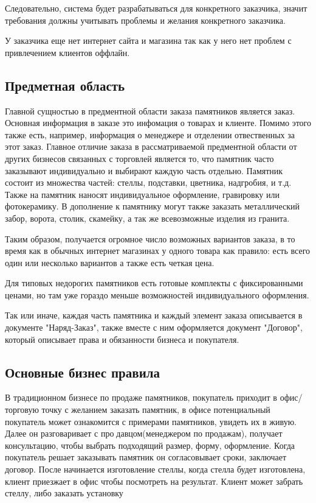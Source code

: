 \documentclass[a4paper,article,14pt]{extarticle}
\begin{document}
Следовательно, система будет разрабатываться для конкретного заказчика, значит требования должны учитывать проблемы и желания
конкретного заказчика.

У заказчика еще нет интернет сайта и магазина так как у него нет проблем с привлечением клиентов оффлайн.

\subsection{Предметная область}
Главной сущностью в предментной области заказа памятников является заказ.
Основная информация в заказе это инфомация о товарах и клиенте.
Помимо этого также есть, например, информация о менеджере и отделении отвественных за этот заказ.
Главное отличие заказа в рассматриваемой предментной области от других бизнесов связанных с торговлей является то, что
памятник часто заказывают индивидуально и выбирают каждую часть отдельно.
Памятник состоит из множества частей: стеллы, подставки, цветника, надгробия, и т.д.
Также на памятник наносят индивидуальное оформление, гравировку или фотокерамику. 
В дополнение к памятнику могут также заказать металлический забор, ворота, столик, скамейку, а так же всевозможные изделия из гранита.

Таким образом, получается огромное число возможных вариантов заказа, в то время как в обычных интернет магазинах у одного товара как правило:
есть всего один или несколько вариантов а также есть четкая цена.

Для типовых недорогих памятников есть готовые комплекты с фиксированными ценами, но там уже гораздо меньше возможностей индивидуального оформления.

Так или иначе, каждая часть памятника и каждый элемент заказа описывается в документе "Наряд-Заказ", 
также вместе с ним оформляется документ "Договор", который описывает права и обязанности бизнеса и покупателя.

\subsection{Основные бизнес правила}

В традиционном бизнесе по продаже памятников, покупатель приходит в офис/торговую точку с желанием заказать памятник, в офисе потенциальный покупатель может
ознакомится с примерами памятников, увидеть их в живую. Далее он разговаривает с продавцом(менеджером по продажам), получает консультацию, чтобы выбрать подходящий
размер, форму, оформление. Когда покупатель решает заказывать памятник он согласовывает сроки, заключает договор. После начинается изготовление стеллы, когда стелла будет
изготовлена, клиент приезжает в офис чтобы посмотреть на результат. Клиент может забрать стеллу, либо заказать установку
\end{document}
